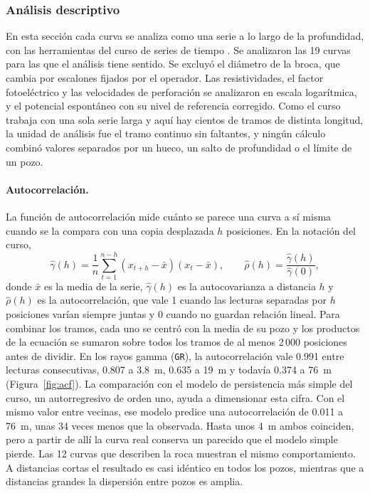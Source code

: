 \documentclass[11pt,a4paper]{article}
\begin{document}
\subsubsection{Análisis descriptivo}
\label{sec:eda-descriptivo}

En esta sección cada curva se analiza como una serie a lo largo de la profundidad, con las herramientas del curso de series de tiempo \cite{shumway2011}. Se analizaron las 19 curvas para las que el análisis tiene sentido. Se excluyó el diámetro de la broca, que cambia por escalones fijados por el operador. Las resistividades, el factor fotoeléctrico y las velocidades de perforación se analizaron en escala logarítmica, y el potencial espontáneo con su nivel de referencia corregido. Como el curso trabaja con una sola serie larga y aquí hay cientos de tramos de distinta longitud, la unidad de análisis fue el tramo continuo sin faltantes, y ningún cálculo combinó valores separados por un hueco, un salto de profundidad o el límite de un pozo.

\paragraph{Autocorrelación.} La función de autocorrelación mide cuánto se parece una curva a sí misma cuando se la compara con una copia desplazada $h$ posiciones. En la notación del curso,
\begin{equation}
\hat{\gamma}(h) = \frac{1}{n}\sum_{t=1}^{n-h} (x_{t+h}-\bar{x})(x_t-\bar{x}), \qquad \hat{\rho}(h) = \frac{\hat{\gamma}(h)}{\hat{\gamma}(0)} ,
\end{equation}
donde $\bar{x}$ es la media de la serie, $\hat{\gamma}(h)$ es la autocovarianza a distancia $h$ y $\hat{\rho}(h)$ es la autocorrelación, que vale 1 cuando las lecturas separadas por $h$ posiciones varían siempre juntas y 0 cuando no guardan relación lineal. Para combinar los tramos, cada uno se centró con la media de su pozo y los productos de la ecuación se sumaron sobre todos los tramos de al menos 2\,000 posiciones antes de dividir. En los rayos gamma (\texttt{GR}), la autocorrelación vale 0.991 entre lecturas consecutivas, 0.807 a 3.8~m, 0.635 a 19~m y todavía 0.374 a 76~m (Figura~\ref{fig:acf}). La comparación con el modelo de persistencia más simple del curso, un autorregresivo de orden uno, ayuda a dimensionar esta cifra. Con el mismo valor entre vecinas, ese modelo predice una autocorrelación de 0.011 a 76~m, unas 34 veces menos que la observada. Hasta unos 4~m ambos coinciden, pero a partir de allí la curva real conserva un parecido que el modelo simple pierde. Las 12 curvas que describen la roca muestran el mismo comportamiento. A distancias cortas el resultado es casi idéntico en todos los pozos, mientras que a distancias grandes la dispersión entre pozos es amplia.
\end{document}
